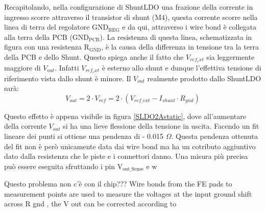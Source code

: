 Recapitolando, nella configurazione di ShuntLDO una frazione della corrente in ingresso scorre attraverso il transistor di shunt (M4), questa corrente scorre nella linea di terra del regolatore $\mathrm{GND_{REG}}$ e da qui, attraverso i wire bond è collegata alla terra della PCB ($\mathrm{GND_{PCB}}$). La resistenza di questa linea, schematizzata in figura con una resistenza $\mathrm{R_{GND}}$, è la causa della differenza in tensione tra la terra della PCB e dello Shunt. Questo spiega anche il fatto che $V_{ref_ext}$ sia leggermente maggiore di $V_{out}$. Infatti  $V_{ref_ext}$ è esterno allo shunt e dunque l'effettiva tensione di riferimento vista dallo shunt è minore. Il $V_{out}$ realmente prodotto dallo ShuntLDO sarà:
\begin{equation}
V_{out} = 2 \cdot V_{ref} = 2 \cdot ( V_{ref {\_} ext} - I_{shunt} \cdot R_{gnd} )
\end{equation}

Questo effetto è appena visibile in figura \ref{SLDO2Astatic}, dove all'aumentare della corrente $V_{out}$ si ha una lieve flessione della tensione in uscita. Facendo un fit lineare dei punti si ottiene una pendenza di - 0.015 $\Omega$. Questa pendenza ottenuta del fit non è però unicamente data dai wire bond ma ha un cotributo aggiuntivo dato dalla resistenza che le piste e i connettori danno. 
Una misura più precisa può essere eseguita sfruttando i pin $\mathrm{V_{out{\_}Sense}}$ e $\mathrm{w}$

Questo problema non c'è con il chip???
Wire bonds from the FE pads to measurement points are used to measure the voltages at the input
ground shift across R gnd , the V out can be corrected according to



